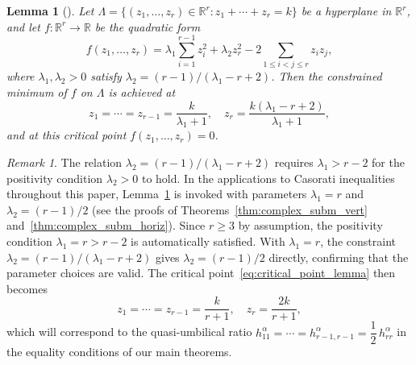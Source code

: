 \documentclass[11pt]{amsart}
\theoremstyle{plain}
\newtheorem{lemma}[proposition]{Lemma}
\theoremstyle{definition}
\theoremstyle{remark}
\newtheorem{remark}[proposition]{Remark}
\begin{document}
\begin{lemma}[\cite{Tripathi2017}]\label{lem:tripathi}
Let $\Lambda = \{(z_1,\ldots,z_r) \in \mathbb{R}^r : 
z_1 + \cdots + z_r = k\}$ be a hyperplane in $\mathbb{R}^r$, 
and let $f: \mathbb{R}^r \to \mathbb{R}$ be the quadratic form
\begin{equation}\label{eq:quadratic_form_lemma}
f(z_1,\ldots,z_r) = \lambda_1\sum_{i=1}^{r-1}z_i^2 
+ \lambda_2 z_r^2 
- 2\sum_{1\le i<j\le r}z_i z_j,
\end{equation}
where $\lambda_1, \lambda_2 > 0$ satisfy 
$\lambda_2 = (r-1)/(\lambda_1 - r + 2)$. Then the constrained 
minimum of $f$ on $\Lambda$ is achieved at
\begin{equation}\label{eq:critical_point_lemma}
z_1 = \cdots = z_{r-1} = \dfrac{k}{\lambda_1+1}, \quad 
z_r = \dfrac{k(\lambda_1 - r + 2)}{\lambda_1+1},
\end{equation}
and at this critical point $f(z_1,\ldots,z_r) = 0$.
\end{lemma}

\begin{remark}\label{rem:tripathi_positivity}
The relation $\lambda_2 = (r-1)/(\lambda_1 - r + 2)$ requires 
$\lambda_1 > r - 2$ for the positivity condition $\lambda_2 > 0$ 
to hold. In the applications to Casorati inequalities throughout 
this paper, Lemma~\ref{lem:tripathi} is invoked with parameters 
$\lambda_1 = r$ and $\lambda_2 = (r-1)/2$ (see the proofs of Theorems~\ref{thm:complex_subm_vert} and~\ref{thm:complex_subm_horiz}). Since $r \geq 3$ by 
assumption, the positivity condition $\lambda_1 = r > r - 2$ 
is automatically satisfied. With $\lambda_1 = r$, the constraint 
$\lambda_2 = (r-1)/(\lambda_1 - r + 2)$ gives 
$\lambda_2 = (r-1)/2$ directly, confirming that 
the parameter choices are valid. The critical 
point~\eqref{eq:critical_point_lemma} then becomes
\[
z_1 = \cdots = z_{r-1} = \dfrac{k}{r+1}, \quad 
z_r = \dfrac{2k}{r+1},
\]
which will correspond to the quasi-umbilical ratio 
$h_{11}^\alpha = \cdots = h_{r-1,r-1}^\alpha 
= \dfrac{1}{2}\,h_{rr}^\alpha$ in the equality conditions 
of our main theorems.
\end{remark}
\end{document}
